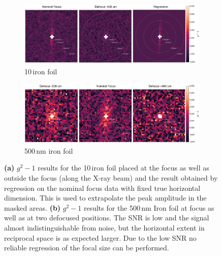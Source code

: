 \begin{figure}
	\centering
	\begin{subfigure}[b]{0.9\textwidth}
		\includegraphics[width=\linewidth]{images/Fe10um_reco2d.pdf}
		\caption{10\,\micrometer iron foil}
		\label{fig:fe10umreco2d}
	\end{subfigure}
	\begin{subfigure}[b]{0.9\textwidth}
		\includegraphics[width=\linewidth]{images/Fe500nm_reco2d.pdf}
		\caption{500\,nm iron foil}
		\label{fig:fe500nmreco2d}
	\end{subfigure}
	\caption[Results iron foils]{\textbf{(a)} $g^2-1$ results for the 10\,\micrometer iron foil placed at the focus as well as outside the focus (along the X-ray beam) and the result obtained by regression on the nominal focus data with fixed true horizontal dimension. This is used to extrapolate the peak amplitude in the masked areas. \textbf{(b)} $g^2-1$ results for the 500\,nm Iron foil at focus as well as at two defocused positions. The SNR is low and the signal almost indistinguishable from noise, but the horizontal extent in reciprocal space is as expected larger. Due to the low SNR no reliable regression of the focal size can be performed.}
	\label{fig:fereco2d}
\end{figure}
